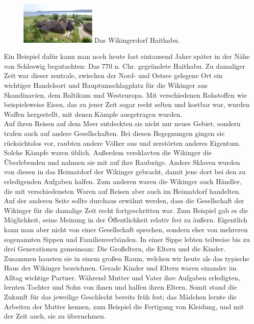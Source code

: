 \documentclass[12pt,a4paper,ngerman,openany]{book}
\begin{document}
\begin{figure}
  \centering
  \includegraphics[width=0.33\textwidth]{haithabu.jpg}
  Das Wikingerdorf Haithabu.
\end{figure}
Ein Beispiel dafür kann man noch heute fast eintausend Jahre später in der Nähe von Schleswig begutachten: Das 770 n. Chr. gegründete Haithabu. Zu damaliger Zeit war dieser zentrale,
zwischen der Nord- und Ostsee gelegene Ort ein wichtiger Handelsort und Hauptumschlagplatz für die Wikinger aus Skandinavien, dem Baltikum und Westeuropa. Mit verschiedenen Rohstoffen wie beispielsweise Eisen,
das zu jener Zeit sogar recht selten und kostbar war, wurden Waffen hergestellt, mit denen Kämpfe ausgetragen wurden.\\ 
Auf ihren Reisen auf dem Meer entdeckten sie nicht nur neues Gebiet, sondern trafen auch auf andere Gesellschaften. Bei diesen Begegnungen gingen sie rücksichtslos vor, raubten andere Völker aus und zerstörten anderes Eigentum.
Solche Kämpfe waren üblich. Außerdem versklavten die Wikinger die Überlebenden und nahmen sie mit auf ihre Raubzüge. Andere Sklaven wurden von diesen in das Heimatdorf der Wikinger gebracht, damit jene dort bei den zu erledigenden Aufgaben halfen.
Zum anderen waren die Wikinger auch Händler, die mit verschiedensten Waren auf Reisen aber auch im Heimatdorf handelten.\\
Auf der anderen Seite sollte durchaus erwähnt werden, dass die Gesellschaft der Wikinger für die damalige Zeit recht fortgeschritten war. Zum Beispiel gab es die Möglichkeit, seine Meinung in der Öffentlichkeit relativ frei zu äußern.
Eigentlich kann man aber nicht von einer Gesellschaft sprechen, sondern eher von mehreren sogenannten Sippen und Familienverbänden. In einer Sippe lebten teilweise bis zu drei Generationen gemeinsam: Die Großeltern, die Eltern und die Kinder.
Zusammen hausten sie in einem großen Raum, welchen wir heute als das typische Haus der Wikinger bezeichnen. Gerade Kinder und Eltern waren einander im Alltag wichtige Partner. Während Mutter und Vater ihre Aufgaben erledigten,
lernten Tochter und Sohn von ihnen und halfen ihren Eltern. Somit stand die Zukunft für das jeweilige Geschlecht bereits früh fest; das Mädchen lernte die Arbeiten der Mutter kennen, zum Beispiel die Fertigung von Kleidung, und mit der Zeit auch, sie zu übernehmen.
\end{document}
